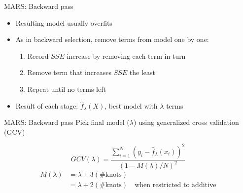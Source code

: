 \documentclass{beamer}
\begin{document}
\begin{frame}{MARS: Backward pass}
  \begin{itemize}[<+->]
    \item Resulting model usually overfits
    \item As in backward selection, remove terms from model one by one:
    \begin{enumerate}
      \item Record $SSE$ increase by removing each term in turn
      \item Remove term that increases $SSE$ the least
      \item Repeat until no terms left
    \end{enumerate}
    \item Result of each stage: $\hat{f}_{\lambda}(X)$, best model with $\lambda$ terms
  \end{itemize}

\end{frame}

\begin{frame}{MARS: Backward pass}
Pick final model ($\lambda$) using generalized cross validation (GCV) 
    
    \pause
    
    \begin{equation*}
    GCV(\lambda) =
      \frac{
        \sum_{i = 1}^{N}(y_{i} - \hat{f}_{\lambda}(x_{i}))^2
      }{
        (1 - M(\lambda)/N)^2
      }
  \end{equation*}
  \begin{align*}
    M(\lambda) &= \lambda + 3(\text{\# knots}) \\
     &=\lambda + 2(\text{\# knots}) \quad \text{when restricted to additive}
  \end{align*}
\end{frame}

\end{document}
